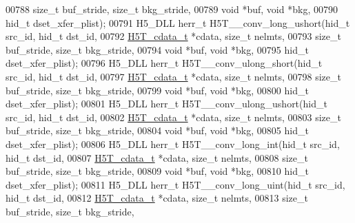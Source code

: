 \begin{DoxyCode}
00788                    \textcolor{keywordtype}{size\_t} buf\_stride, \textcolor{keywordtype}{size\_t} bkg\_stride,
00789                                    \textcolor{keywordtype}{void} *buf, \textcolor{keywordtype}{void} *bkg,
00790                                    hid\_t dset\_xfer\_plist);
00791 H5\_DLL herr\_t H5T\_\_conv\_long\_ushort(hid\_t src\_id, hid\_t dst\_id,
00792                     \hyperlink{struct_h5_t__cdata__t}{H5T\_cdata\_t} *cdata, \textcolor{keywordtype}{size\_t} nelmts,
00793                     \textcolor{keywordtype}{size\_t} buf\_stride, \textcolor{keywordtype}{size\_t} bkg\_stride,
00794                                     \textcolor{keywordtype}{void} *buf, \textcolor{keywordtype}{void} *bkg,
00795                                     hid\_t dset\_xfer\_plist);
00796 H5\_DLL herr\_t H5T\_\_conv\_ulong\_short(hid\_t src\_id, hid\_t dst\_id,
00797                     \hyperlink{struct_h5_t__cdata__t}{H5T\_cdata\_t} *cdata, \textcolor{keywordtype}{size\_t} nelmts,
00798                     \textcolor{keywordtype}{size\_t} buf\_stride, \textcolor{keywordtype}{size\_t} bkg\_stride,
00799                                     \textcolor{keywordtype}{void} *buf, \textcolor{keywordtype}{void} *bkg,
00800                                     hid\_t dset\_xfer\_plist);
00801 H5\_DLL herr\_t H5T\_\_conv\_ulong\_ushort(hid\_t src\_id, hid\_t dst\_id,
00802                      \hyperlink{struct_h5_t__cdata__t}{H5T\_cdata\_t} *cdata, \textcolor{keywordtype}{size\_t} nelmts,
00803                      \textcolor{keywordtype}{size\_t} buf\_stride, \textcolor{keywordtype}{size\_t} bkg\_stride,
00804                                      \textcolor{keywordtype}{void} *buf, \textcolor{keywordtype}{void} *bkg,
00805                                      hid\_t dset\_xfer\_plist);
00806 H5\_DLL herr\_t H5T\_\_conv\_long\_int(hid\_t src\_id, hid\_t dst\_id,
00807                  \hyperlink{struct_h5_t__cdata__t}{H5T\_cdata\_t} *cdata, \textcolor{keywordtype}{size\_t} nelmts,
00808                  \textcolor{keywordtype}{size\_t} buf\_stride, \textcolor{keywordtype}{size\_t} bkg\_stride,
00809                                  \textcolor{keywordtype}{void} *buf, \textcolor{keywordtype}{void} *bkg,
00810                                  hid\_t dset\_xfer\_plist);
00811 H5\_DLL herr\_t H5T\_\_conv\_long\_uint(hid\_t src\_id, hid\_t dst\_id,
00812                   \hyperlink{struct_h5_t__cdata__t}{H5T\_cdata\_t} *cdata, \textcolor{keywordtype}{size\_t} nelmts,
00813                   \textcolor{keywordtype}{size\_t} buf\_stride, \textcolor{keywordtype}{size\_t} bkg\_stride,

\end{DoxyCode}
